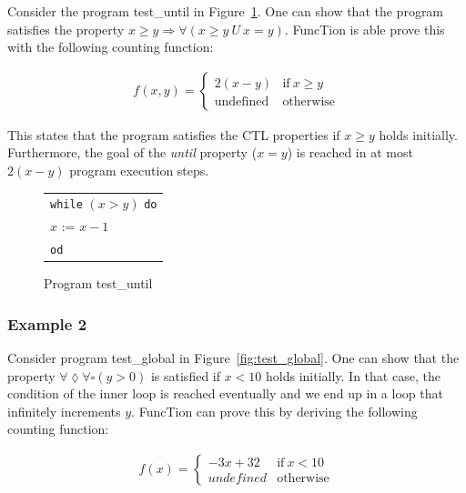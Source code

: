 \documentclass[11pt,a4paper,titlepage]{article}
\theoremstyle{definition}
\begin{document}
Consider the program \textsf{test\_until} in Figure~\ref{fig:test_until}. 
One can show that the program satisfies the property $x \geq y \Rightarrow \forall(x \geq y \ U \ x = y)$. 
FuncTion is able prove this with the following counting function:

\begin{align*}
f(x, y) = \begin{cases}
    2(x-y) & \text{if} \ x \geq y \\
    \text{undefined}    & \text{otherwise}
\end{cases}
\end{align*}

This states that the program satisfies the CTL properties if $x \geq y$ holds initially. Furthermore, the goal of the \textit{until}
property ($x = y$) is reached in at most $2(x-y)$ program execution steps.


\begin{figure}
    \begin{center}
        \begin{tabular}{l}
            \texttt{while} $(x > y)$ \texttt{do} \\
            \hspace{1em}$x$ := $x - 1$ \\
            \texttt{od}
        \end{tabular}
    \end{center}
    \vspace{-1em}
    \caption{Program \textsf{test\_until}}
    \label{fig:test_until}
\end{figure}


\subsubsection*{Example 2}

Consider program \textsf{test\_global} in Figure~\ref{fig:test_global}. One can show that the property $\forall\lozenge\forall\square(y > 0)$ 
is satisfied if $x < 10$ holds initially. In that case, the condition of the inner loop is reached eventually and we end up in a 
loop that infinitely increments $y$. FuncTion can prove this by deriving the following counting function:

\begin{align*}
f(x) = \begin{cases}
    -3x + 32 & \text{if} \ x < 10 \\
    undefined  & \text{otherwise}
\end{cases}
\end{align*}
\end{document}

